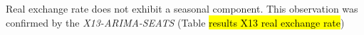 Real exchange rate does not exhibit a seasonal component. This observation was confirmed by the \textit{X13-ARIMA-SEATS} (Table \hl{results X13 real exchange rate})